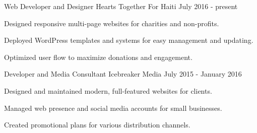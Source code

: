 \vspace*{-5mm}
\begin{cventries}
  \cventry
    {Web Developer and Designer}
    {Hearts Together For Haiti}
    {July 2016 - present}
    {}
    {
      \begin{cvitems}
        \item {Designed responsive multi-page websites for charities and non-profits.}
        \item {Deployed WordPress templates and systems for easy management and updating.}
        \item {Optimized user flow to maximize donations and engagement.}
      \end{cvitems}
    }
  \cventry
    {Developer and Media Consultant}
    {Icebreaker Media}
    {July 2015 - January 2016}
    {}
    {
      \begin{cvitems}
        \item {Designed and maintained modern, full-featured websites for clients.}
        \item {Managed web presence and social media accounts for small businesses.}
        \item {Created promotional plans for various distribution channels.}
      \end{cvitems}
    }
  
\end{cventries}
